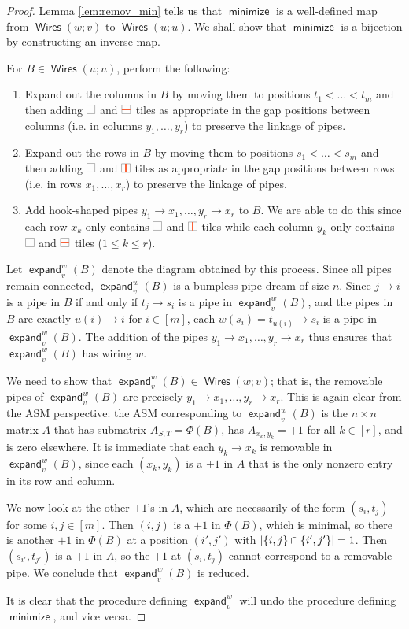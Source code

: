 \documentclass[11pt]{article}
\theoremstyle{definition}
\numberwithin{equation}{section}
\DeclarePairedDelimiter\abs{\lvert}{\rvert}
\DeclareMathOperator{\minimize}{\mathsf{minimize}}
\DeclareMathOperator{\expand}{\mathsf{expand}}
\DeclareMathOperator{\Wires}{\mathsf{Wires}}
\newcommand{\pipecolor}{UForange}
\newcommand{\tilescale}{0.27}
\newcommand{\drawSquare}{
    \draw[
        xshift=0.5cm,yshift=0.5cm,
        black,opacity=0.5,thin
    ] (0,0) rectangle (1,1);
}
\newcommand{\drawHorizontal}[2]{
    \draw[color=\pipecolor,very thick]
    (#1-0.5,#2) to (#1+0.5,#2);
}
\newcommand{\drawVertical}[2]{
    \draw[color=\pipecolor,very thick]
    (#1,#2-0.5) to (#1,#2+0.5);
}
\newcommand{\blank}[1][scale=\tilescale,baseline=4pt]{
    \begin{tikzpicture}[#1]
    \drawSquare
    \end{tikzpicture}
}
\newcommand{\horizontal}[1][scale=\tilescale,baseline=4pt]{
    \begin{tikzpicture}[#1]
    \drawSquare
    \drawHorizontal11
    \end{tikzpicture}
}
\newcommand{\vertical}[1][scale=\tilescale,baseline=4pt]{
    \begin{tikzpicture}[#1]
    \drawSquare
    \drawVertical11
    \end{tikzpicture}
}
\begin{document}
\begin{proof}
    Lemma \ref{lem:remov_min} tells us that $\minimize$ is a well-defined map from $\Wires(w;v)$ to $\Wires(u;u)$.
    We shall show that $\minimize$ is a bijection by constructing an inverse map.
    
    For $B\in \Wires(u;u)$, perform the following:
    \begin{enumerate}
        \item[($1'$)] Expand out the columns in $B$ by moving them to positions $t_1<\dots<t_m$ and then adding $\blank$ and $\horizontal$ tiles as appropriate in the gap positions between columns (i.e. in columns $y_1,\dots,y_r$) to preserve the linkage of pipes.
        \item[($2'$)] Expand out the rows in $B$ by moving them to positions $s_1<\dots<s_m$ and then adding $\blank$ and $\vertical$ tiles as appropriate in the gap positions between rows (i.e. in rows $x_1,\dots,x_r$) to preserve the linkage of pipes.
        \item[($3'$)] Add hook-shaped pipes $y_1\to x_1,\dots,y_r\to x_r$ to $B$.
        We are able to do this since each row $x_k$ only contains $\blank$ and $\vertical$ tiles while each column $y_k$ only contains $\blank$ and $\horizontal$ tiles ($1\leq k\leq r$).
    \end{enumerate}
    Let $\expand_v^w(B)$ denote the diagram obtained by this process.
    Since all pipes remain connected, $\expand_v^w(B)$ is a bumpless pipe dream of size $n$.
    Since $j\to i$ is a pipe in $B$ if and only if $t_j\to s_i$ is a pipe in $\expand_v^w(B)$, and the pipes in $B$ are exactly $u(i)\to i$ for $i\in[m]$, each $w(s_i) = t_{u(i)} \to s_i$ is a pipe in $\expand_v^w(B)$.
    The addition of the pipes $y_1\to x_1,\dots, y_r\to x_r$ thus ensures that $\expand_v^w(B)$ has wiring $w$.
    
    We need to show that $\expand_v^w(B) \in \Wires(w;v)$; that is, the removable pipes of $\expand_v^w(B)$ are precisely $y_1\to x_1,\dots,y_r\to x_r$.
    This is again clear from the ASM perspective:
    the ASM corresponding to $\expand_v^w(B)$ is the $n\times n$ matrix $A$ that has submatrix $A_{S, T} = \Phi(B)$, has $A_{x_k,y_k} = +1$ for all $k\in[r]$, and is zero elsewhere.
    It is immediate that each $y_k\to x_k$ is removable in $\expand_v^w(B)$, since each $(x_k,y_k)$ is a $+1$ in $A$ that is the only nonzero entry in its row and column.

    We now look at the other $+1$'s in $A$, which are necessarily of the form $(s_i,t_j)$ for some $i,j\in[m]$.
    Then $(i,j)$ is a $+1$ in $\Phi(B)$, which is minimal, so there is another $+1$ in $\Phi(B)$ at a position $(i',j')$ with $\abs*{\{i,j\}\cap \{i',j'\}}=1$.
    Then $(s_{i'},t_{j'})$ is a $+1$ in $A$, so the $+1$ at $(s_i,t_j)$ cannot correspond to a removable pipe.
    We conclude that $\expand_v^w(B)$ is reduced.
    
    It is clear that the procedure defining $\expand_v^w$ will undo the procedure defining $\minimize$, and vice versa.
\end{proof}
\end{document}
